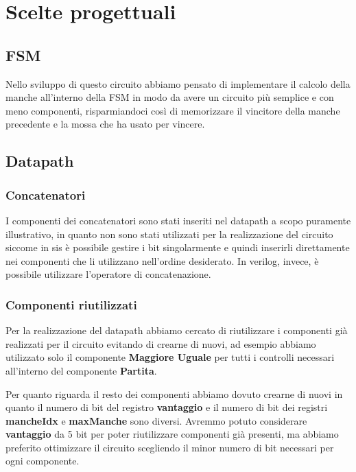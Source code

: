 \documentclass[a4paper]{article}
\begin{document}
\section{Scelte progettuali}
\subsection{FSM}
Nello sviluppo di questo circuito abbiamo pensato di implementare il calcolo della manche all'interno della
FSM in modo da avere un circuito più semplice e con meno componenti, risparmiandoci così di memorizzare il
vincitore della manche precedente e la mossa che ha usato per vincere.

\subsection{Datapath}
\subsubsection{Concatenatori}
I componenti dei concatenatori sono stati inseriti nel datapath a scopo puramente illustrativo, in quanto
non sono stati utilizzati per la realizzazione del circuito siccome in sis è possibile gestire i bit singolarmente
e quindi inserirli direttamente nei componenti che li utilizzano nell'ordine desiderato. In verilog, invece,
è possibile utilizzare l'operatore di concatenazione.

\subsubsection{Componenti riutilizzati}
Per la realizzazione del datapath abbiamo cercato di riutilizzare i componenti già realizzati per il circuito
evitando di crearne di nuovi, ad esempio abbiamo utilizzato solo il componente \textbf{Maggiore Uguale} per 
tutti i controlli necessari all'interno del componente \textbf{Partita}.

\noindent Per quanto riguarda il resto dei componenti abbiamo dovuto crearne di nuovi in quanto il numero di
bit del registro \textbf{vantaggio} e il numero di bit dei registri \textbf{mancheIdx} e \textbf{maxManche}
sono diversi. Avremmo potuto considerare \textbf{vantaggio} da 5 bit per poter riutilizzare componenti già presenti,
ma abbiamo preferito ottimizzare il circuito scegliendo il minor numero di bit necessari per ogni componente.
\end{document}
